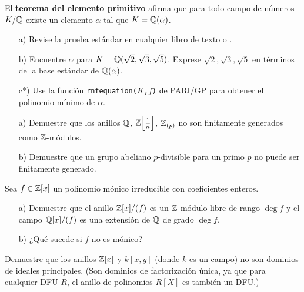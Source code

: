 \begin{ejercicio}
  El \textbf{teorema del elemento primitivo} afirma que para todo campo
  de números $K/\mathbb{Q}$ existe un elemento $\alpha$ tal que $K = \mathbb{Q} (\alpha)$.

  \begin{enumerate}
  \item[a)] Revise la prueba estándar en cualquier libro de texto
    \cite[Chapter V, Theorem 4.6]{Lang-Algebra} o
    \cite[Chapter I, Theorem 5.6]{Morandi-GTM167}.

  \item[b)] Encuentre $\alpha$ para
    $K = \mathbb{Q} (\sqrt{2}, \sqrt{3}, \sqrt{5})$. Exprese
    $\sqrt{2}, \sqrt{3}, \sqrt{5}$ en términos de la base estándar de
    $\mathbb{Q} (\alpha)$.

  \item[c*)] Use la función \texttt{rnfequation($K$,$f$)} de PARI/GP para
    obtener el polinomio mínimo de $\alpha$.
  \end{enumerate}
\end{ejercicio}

\begin{ejercicio}
  \begin{enumerate}
  \item[a)] Demuestre que los anillos $\mathbb{Q}$, $\mathbb{Z} \Bigl[\frac{1}{n}\Bigr]$,
    $\mathbb{Z}_{(p)}$ no son finitamente generados como $\mathbb{Z}$-módulos.

  \item[b)] Demuestre que un grupo abeliano $p$-divisible para un primo $p$ no
    puede ser finitamente generado.
  \end{enumerate}
\end{ejercicio}

\begin{ejercicio}
  Sea $f \in \mathbb{Z} [x]$ un polinomio mónico irreducible con coeficientes enteros.

  \begin{enumerate}
    \item[a)] Demuestre que el anillo $\mathbb{Z} [x] / (f)$ es un $\mathbb{Z}$-módulo libre
      de rango $\deg f$ y el campo $\mathbb{Q} [x] / (f)$ es una extensión de $\mathbb{Q}$ de
      grado $\deg f$.

    \item[b)] ¿Qué sucede si $f$ no es mónico?
  \end{enumerate}
\end{ejercicio}

\begin{ejercicio}
  Demuestre que los anillos $\mathbb{Z} [x]$ y $k [x,y]$ (donde $k$ es un campo) no son
  dominios de ideales principales. (Son dominios de factorización única, ya que
  para cualquier DFU $R$, el anillo de polinomios $R[X]$ es también un DFU.)
\end{ejercicio}

